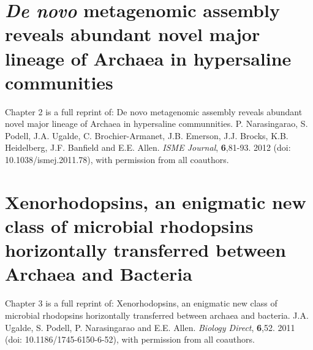 \documentclass[12pt,chapterheads]{ucsd}
\begin{document}
%







%   
%   
%



\chapter{\textit{De novo} metagenomic assembly reveals abundant novel major lineage of Archaea in hypersaline communities}

Chapter 2 is a full reprint of: De novo metagenomic assembly reveals abundant novel major lineage of Archaea in hypersaline communnities. P. Narasingarao, S. Podell, J.A. Ugalde, C. Brochier-Armanet, J.B. Emerson, J.J. Brocks, K.B. Heidelberg, J.F. Banfield and E.E. Allen. \textit{ISME Journal}, \textbf{6},81-93. 2012 (doi: 10.1038/ismej.2011.78), with permission from all coauthors.


\chapter{Xenorhodopsins, an enigmatic new class of microbial rhodopsins horizontally transferred between Archaea and Bacteria}

Chapter 3 is a full reprint of: Xenorhodopsins, an enigmatic new class of microbial rhodopsins horizontally transferred between archaea and bacteria. J.A. Ugalde, S. Podell, P. Narasingarao and E.E. Allen. \textit{Biology Direct}, \textbf{6},52. 2011 (doi: 10.1186/1745-6150-6-52), with permission from all coauthors.


\end{document}
